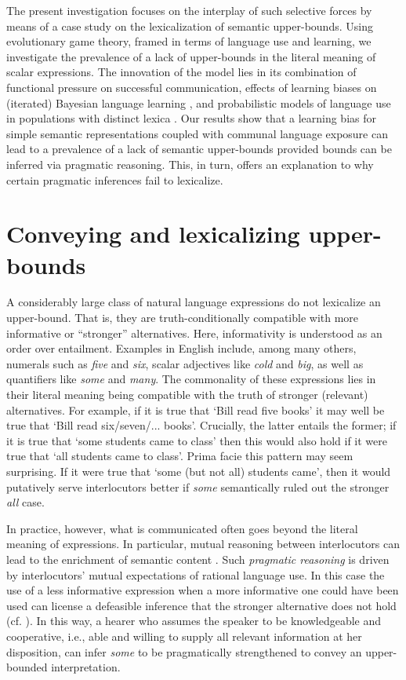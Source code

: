 \documentclass[10pt,a4paper]{article}
\begin{document}
The present investigation focuses on the interplay of such selective forces by means of a case study on the lexicalization of semantic upper-bounds. Using evolutionary game theory, framed in terms of language use and learning, we investigate the prevalence of a lack of upper-bounds in the literal meaning of scalar expressions. The innovation of the model lies in its combination of functional pressure on successful communication, effects of learning biases on (iterated) Bayesian language learning \citep{griffiths+kalish:2007}, and probabilistic models of language use in populations with distinct lexica \citep{frank+goodman:2012,franke+jaeger:2014,bergen+etal:2015}. Our results show that a learning bias for simple semantic representations coupled with communal language exposure can lead to a prevalence of a lack of semantic upper-bounds provided bounds can be inferred via pragmatic reasoning. This, in turn, offers an explanation to why certain pragmatic inferences fail to lexicalize. 



\section{Conveying and lexicalizing upper-bounds}
A considerably large class of natural language expressions do not lexicalize an upper-bound. That is, they are truth-conditionally compatible with more informative or ``stronger'' alternatives. Here, informativity is understood as an order over entailment. Examples in English include, among many others, numerals such as {\em five} and {\em six}, scalar adjectives like {\em cold} and {\em big}, as well as quantifiers like {\em some} and {\em many}. The commonality of these expressions lies in their literal meaning being compatible with the truth of stronger (relevant) alternatives. For example, if it is true that `Bill read five books' it may well be true that `Bill read six/seven/... books'. Crucially, the latter entails the former; if it is true that `some students came to class' then this would also hold if it were true that `all students came to class'. Prima facie this pattern may seem surprising. If it were true that `some (but not all) students came', then it would putatively serve interlocutors better if {\em some} semantically ruled out the stronger {\em all} case. 

In practice, however, what is communicated often goes beyond the literal meaning of expressions. In particular, mutual reasoning between interlocutors can lead to the enrichment of semantic content \citep{grice:1975}. Such {\em pragmatic reasoning} is driven by interlocutors' mutual expectations of rational language use. In this case the use of a less informative expression when a more informative one could have been used can license a defeasible inference that the stronger alternative does not hold (cf. \citealt{horn:1972,gazdar:1979a}). In this way, a hearer who assumes the speaker to be knowledgeable and cooperative, i.e., able and willing to supply all relevant information at her disposition, can infer {\em some} to be pragmatically strengthened to convey an upper-bounded interpretation. 
\end{document}
